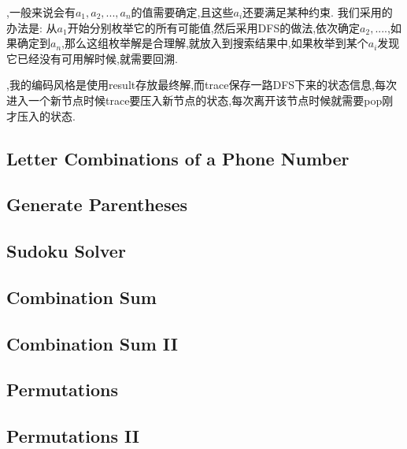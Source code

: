 
,一般来说会有$a_1, a_2, ..., a_n$的值需要确定,且这些$a_i$还要满足某种约束. 我们采用的办法是: 从$a_1$开始分别枚举它的所有可能值,然后采用DFS的做法,依次确定$a_2, ....$,如果确定到$a_n$,那么这组枚举解是合理解,就放入到搜索结果中,如果枚举到某个$a_i$发现它已经没有可用解时候,就需要回溯.

,我的编码风格是使用result存放最终解,而trace保存一路DFS下来的状态信息,每次进入一个新节点时候trace要压入新节点的状态,每次离开该节点时候就需要pop刚才压入的状态.
\subsection{Letter Combinations of a Phone Number}

\subsection{Generate Parentheses}

\subsection{Sudoku Solver}

\subsection{Combination Sum}

\subsection{Combination Sum II}

\subsection{Permutations}

\subsection{Permutations II}

